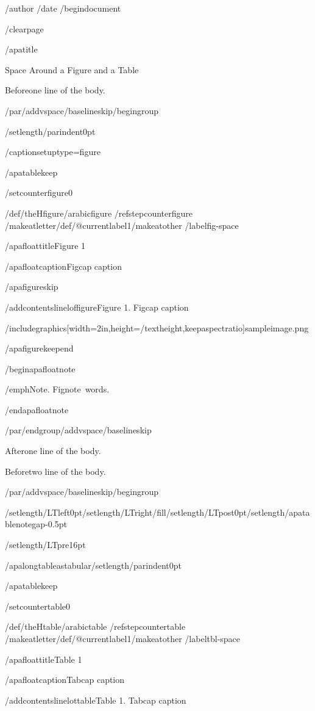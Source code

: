 /author{}
/date{}
/begin{document}


/clearpage

/apatitle{

Space Around a Figure and a Table

}

Beforeone line of the body.

/par/addvspace{/baselineskip}/begingroup

/setlength{/parindent}{0pt}

/captionsetup{type=figure}

/apatablekeep

/setcounter{figure}{0}

/def/theHfigure{/arabic{figure}}%
/refstepcounter{figure}%
/makeatletter/def/@currentlabel{1}/makeatother%
/label{fig-space}

/apafloattitle{Figure 1}

/apafloatcaption{Figcap caption}

/apafigureskip

/addcontentsline{lof}{figure}{Figure 1. Figcap caption}

/includegraphics[width=2in,height=/textheight,keepaspectratio]{sampleimage.png}

/apafigurekeepend

/begin{apafloatnote}

/emph{Note}. Fignote~words.

/end{apafloatnote}

/par/endgroup/addvspace{/baselineskip}

Afterone line of the body.

Beforetwo line of the body.

/par/addvspace{/baselineskip}/begingroup

/setlength{/LTleft}{0pt}/setlength{/LTright}{/fill}/setlength{/LTpost}{0pt}/setlength{/apatablenotegap}{-0.5pt}

/setlength{/LTpre}{16pt}

/apalongtableastabular/setlength{/parindent}{0pt}

/apatablekeep

/setcounter{table}{0}

/def/theHtable{/arabic{table}}%
/refstepcounter{table}%
/makeatletter/def/@currentlabel{1}/makeatother%
/label{tbl-space}

/apafloattitle{Table 1}

/apafloatcaption{Tabcap caption}

/addcontentsline{lot}{table}{Table 1. Tabcap caption}

